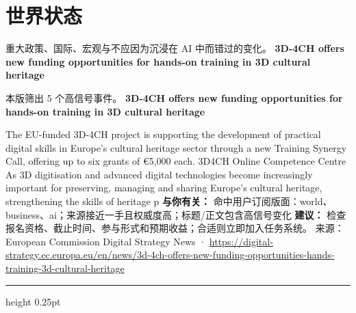 \documentclass[10.5pt]{ctexart}
\begin{document}
\section*{世界状态}
{\color{ormuted} 重大政策、国际、宏观与不应因为沉浸在 AI 中而错过的变化。}
\vspace{2mm}
{\LARGE\bfseries 3D-4CH offers new funding opportunities for hands-on training in 3D cultural heritage}\par
\vspace{1mm}
{\color{ormuted} 本版筛出 5 个高信号事件。}
\vspace{3mm}
{\Large\bfseries 3D-4CH offers new funding opportunities for hands-on training in 3D cultural heritage}\par
The EU-funded 3D-4CH project is supporting the development of practical digital skills in Europe's cultural heritage sector through a new Training Synergy Call, offering up to six grants of €5,000 each. 3D4CH Online Competence Centre As 3D digitisation and advanced digital technologies become increasingly important for preserving, managing and sharing Europe's cultural heritage, strengthening the skills of heritage p
\textbf{与你有关：} 命中用户订阅版面：world、business、ai；来源接近一手且权威度高；标题/正文包含高信号变化
\textbf{建议：} 检查报名资格、截止时间、参与形式和预期收益；合适则立即加入任务系统。
{\footnotesize\color{ormuted} 来源：European Commission Digital Strategy News · \url{https://digital-strategy.ec.europa.eu/en/news/3d-4ch-offers-new-funding-opportunities-hands-training-3d-cultural-heritage}}
\vspace{4mm}
\hrule height 0.25pt
\vspace{3mm}
\end{document}
